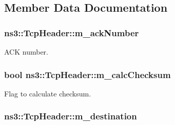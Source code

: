 \subsection{Member Data Documentation}
\subsubsection[{\texorpdfstring{m\+\_\+ack\+Number}{m_ackNumber}}]{ ns3\+::\+Tcp\+Header\+::m\+\_\+ack\+Number\hspace{0.3cm}{\ttfamily [private]}}\hypertarget{classns3_1_1TcpHeader_acee437093aa7817e583ad5f62afc9cca}{}\label{classns3_1_1TcpHeader_acee437093aa7817e583ad5f62afc9cca}


A\+CK number. 

\subsubsection[{\texorpdfstring{m\+\_\+calc\+Checksum}{m_calcChecksum}}]{\setlength{\rightskip}{0pt plus 5cm}bool ns3\+::\+Tcp\+Header\+::m\+\_\+calc\+Checksum\hspace{0.3cm}{\ttfamily [private]}}\hypertarget{classns3_1_1TcpHeader_a75e3fab988b34ad7406eff0134c1777c}{}\label{classns3_1_1TcpHeader_a75e3fab988b34ad7406eff0134c1777c}


Flag to calculate checksum. 

\subsubsection[{\texorpdfstring{m\+\_\+destination}{m_destination}}]{ ns3\+::\+Tcp\+Header\+::m\+\_\+destination\hspace{0.3cm}{\ttfamily [private]}}\hypertarget{classns3_1_1TcpHeader_a8e272fcbe69041005e319f0e4aa1d5ab}{}\label{classns3_1_1TcpHeader_a8e272fcbe69041005e319f0e4aa1d5ab}


